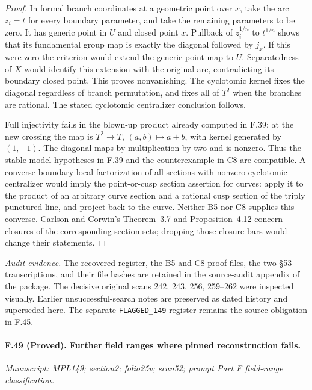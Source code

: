 \begin{proof}
In formal branch coordinates at a geometric point over $x$, take
the arc $z_i=t$ for every boundary parameter, and take the remaining
parameters to be zero. It has generic point in $U$ and closed point
$x$. Pullback of $z_i^{1/n}$ to $t^{1/n}$ shows that its fundamental
group map is exactly the diagonal followed by $j_x$. If this were
zero the criterion would extend the generic-point map to $U$.
Separatedness of $X$ would identify this extension with the original
arc, contradicting its boundary closed point. This proves
nonvanishing. The cyclotomic kernel fixes the diagonal regardless
of branch permutation, and fixes all of $T^I$ when the branches
are rational. The stated cyclotomic centralizer conclusion follows.

Full injectivity fails in the blown-up product already computed in
F.39: at the new crossing the map is
$T^2\to T$, $(a,b)\mapsto a+b$, with kernel generated by $(1,-1)$.
The diagonal maps by multiplication by two and is nonzero. Thus the
stable-model hypotheses in F.39 and the counterexample in C8 are
compatible. A converse boundary-local factorization of all sections
with nonzero cyclotomic centralizer would imply the point-or-cusp
section assertion for curves: apply it to the product of an arbitrary
curve section and a rational cusp section of the triply punctured
line, and project back to the curve. Neither B5 nor C8 supplies this
converse. Carlson and Corwin's Theorem~3.7 and Proposition~4.12
concern closures of the corresponding section sets; dropping those
closure bars would change their statements.
\end{proof}

\emph{Audit evidence.}
The recovered register, the B5 and C8 proof files, the two \S53
transcriptions, and their file hashes are retained in the source-audit
appendix of the package. The decisive original scans 242, 243, 256,
259--262 were inspected visually. Earlier unsuccessful-search notes
are preserved as dated history and superseded here. The separate
\texttt{FLAGGED\_149} register remains the source obligation in F.45.

\paragraph{F.49 (Proved). Further field ranges where pinned reconstruction fails.}
\textit{Manuscript: MPL149; section2; folio25v; scan52; prompt Part F field-range classification.}

